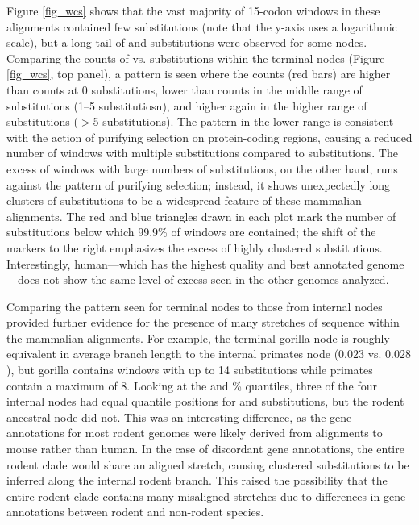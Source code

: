 Figure \ref{fig_wcs} shows that the vast majority of 15-codon windows
in these alignments contained few substitutions (note that the y-axis
uses a logarithmic scale), but a long tail of \nsyn and \syn
substitutions were observed for some nodes. Comparing the counts of
\nsyn vs. \syn substitutions within the terminal nodes (Figure
\ref{fig_wcs}, top panel), a pattern is seen where the \nsyn counts
(red bars) are higher than \syn counts at 0 substitutions, lower than
\syn counts in the middle range of substitutions (1--5 substitutiosn),
and higher again in the higher range of substitutions ($>$5
substitutions). The pattern in the lower range is consistent with the
action of purifying selection on protein-coding regions, causing a
reduced number of windows with multiple \nsyn substitutions compared
to \syn substitutions. The excess of windows with large numbers of
\nsyn substitutions, on the other hand, runs against the pattern of
purifying selection; instead, it shows unexpectedly long clusters of
\nsyn substitutions to be a widespread feature of these mammalian
alignments. The red and blue triangles drawn in each plot mark the
number of substitutions below which 99.9\% of windows are contained;
the shift of the \nsyn markers to the right emphasizes the excess of
highly clustered \nsyn substitutions. Interestingly, human---which has
the highest quality and best annotated genome---does not show the same
level of excess seen in the other genomes analyzed.

Comparing the pattern seen for terminal nodes to those from internal
nodes provided further evidence for the presence of many stretches of
\nhom sequence within the mammalian alignments. For example, the
terminal gorilla node is roughly equivalent in average branch length
to the internal primates node ($0.023$ vs. $0.028$), but gorilla
contains windows with up to 14 \nsyn substitutions while primates
contain a maximum of 8. Looking at the \nsyn and \%
quantiles, three of the four internal nodes had equal quantile
positions for \nsyn and \syn substitutions, but the rodent ancestral
node did not. This was an interesting difference, as the gene
annotations for most rodent genomes were likely derived from
alignments to mouse rather than human. In the case of discordant gene
annotations, the entire rodent clade would share an aligned \nhom
stretch, causing clustered substitutions to be inferred along the
internal rodent branch. This raised the possibility that the entire
rodent clade contains many misaligned \nhom stretches due to
differences in gene annotations between rodent and non-rodent species.

